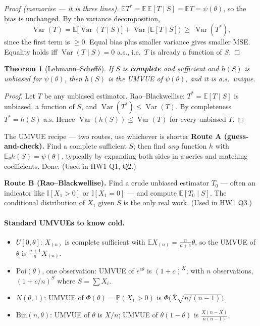 \documentclass[11pt]{article}
\newtheorem{theorem}{Theorem}[section]
\theoremstyle{remark}
\newcommand{\E}{\mathbb{E}}
\newcommand{\Var}{\operatorname{Var}}
\newcommand{\Prob}{\mathbb{P}}
\newcommand{\Xbar}{\overline{X}}
\begin{document}
\begin{proof}[Proof (memorise --- it is three lines)]
$\E T^*=\E\,\E[T\mid S]=\E T=\psi(\theta)$, so the bias is unchanged. By the variance
decomposition,
\[
\Var(T)=\E\big[\Var(T\mid S)\big]+\Var\big(\E[T\mid S]\big)\ \ge\ \Var(T^*),
\]
since the first term is $\ge0$. Equal bias plus smaller variance gives smaller MSE.
Equality holds iff $\Var(T\mid S)=0$ a.s., i.e.\ $T$ is already a function of $S$.
\end{proof}

\begin{theorem}[Lehmann--Scheff\'e]
If $S$ is \textbf{complete} and sufficient and $h(S)$ is unbiased for $\psi(\theta)$, then
$h(S)$ is \emph{the} UMVUE of $\psi(\theta)$, and it is a.s.\ unique.
\end{theorem}

\begin{proof}
Let $T$ be any unbiased estimator. Rao--Blackwellise: $T^*=\E[T\mid S]$ is unbiased, a
function of $S$, and $\Var(T^*)\le\Var(T)$. By completeness $T^*=h(S)$ a.s. Hence
$\Var(h(S))\le\Var(T)$ for every unbiased $T$.
\end{proof}

\begin{recipebox}{The UMVUE recipe --- two routes, use whichever is shorter}
\textbf{Route A (guess-and-check).} Find a complete sufficient $S$; then find \emph{any}
function $h$ with $\E_\theta h(S)=\psi(\theta)$, typically by expanding both sides in a series
and matching coefficients. Done. (Used in HW1 Q1, Q2.)

\smallskip
\textbf{Route B (Rao--Blackwellise).} Find a crude unbiased estimator $T_0$ --- often an
indicator like $\mathbb{I}[X_1>0]$ or $\mathbb{I}[X_1=0]$ --- and compute $\E[T_0\mid S]$.
The conditional distribution of $X_1$ given $S$ is the only real work. (Used in HW1 Q3.)
\end{recipebox}

\paragraph{Standard UMVUEs to know cold.}
\begin{itemize}
\item $U[0,\theta]$: $X_{(n)}$ is complete sufficient with $\E X_{(n)}=\frac{n}{n+1}\theta$,
so the UMVUE of $\theta$ is $\frac{n+1}{n}X_{(n)}$.
\item $\mathrm{Poi}(\theta)$, one observation: UMVUE of $e^{c\theta}$ is $(1+c)^{X}$; with $n$
observations, $(1+c/n)^{S}$ where $S=\sum X_i$.
\item $N(\theta,1)$: UMVUE of $\Phi(\theta)=\Prob(X_1>0)$ is
$\Phi\!\big(\Xbar\sqrt{n/(n-1)}\big)$.
\item $\mathrm{Bin}(n,\theta)$: UMVUE of $\theta$ is $X/n$; UMVUE of $\theta(1-\theta)$ is
$\frac{X(n-X)}{n(n-1)}$.
\end{itemize}
\end{document}
